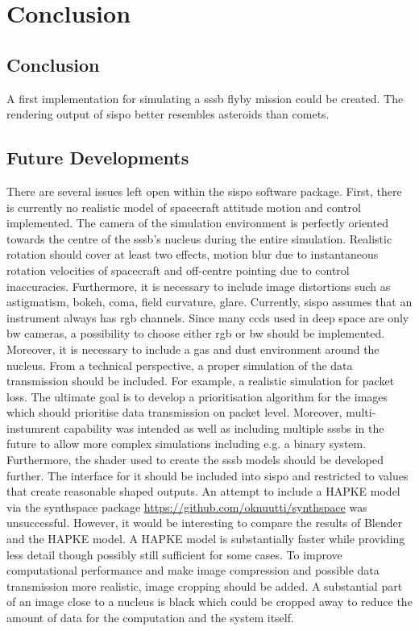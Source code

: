 \section{Conclusion} \label{sec:conclusion}
\subsection{Conclusion}
A first implementation for simulating a \gls{sssb} flyby mission could be created.
The rendering output of \gls{sispo} better resembles asteroids than comets.

\subsection{Future Developments}
There are several issues left open within the \gls{sispo} software package. First, there is currently no realistic model of spacecraft attitude motion and control implemented. The camera of the simulation environment is perfectly oriented towards the centre of the \gls{sssb}'s nucleus during the entire simulation. Realistic rotation should cover at least two effects, motion blur due to instantaneous rotation velocities of spacecraft and off-centre pointing due to control inaccuracies. Furthermore, it is necessary to include  image distortions such as astigmatism, bokeh, coma, field curvature, glare.
Currently, \gls{sispo} assumes that an instrument always has \gls{rgb} channels. Since many \gls{ccd}s used in deep space are only \gls{bw} cameras, a possibility to choose either \gls{rgb} or \gls{bw} should be implemented.
Moreover, it is necessary to include a gas and dust environment around the nucleus. From a technical perspective, a proper simulation of the data transmission should be included. For example, a realistic simulation for packet loss. The ultimate goal is to develop a prioritisation algorithm for the images which should prioritise data transmission on packet level.
Moreover, multi-instumrent capability was intended as well as including multiple \gls{sssb}s in the future to allow more complex simulations including e.g. a binary system.
Furthermore, the shader used to create the \gls{sssb} models should be developed further. The interface for it should be included into \gls{sispo} and restricted to values that create reasonable shaped outputs.
An attempt to include a HAPKE model via the synthspace package \url{https://github.com/oknuutti/synthspace} was unsuccessful. However, it would be interesting to compare the results of Blender and the HAPKE model. A HAPKE model is substantially faster while providing less detail though possibly still sufficient for some cases.
To improve computational performance and make image compression and possible data transmission more realistic, image cropping should be added. A substantial part of an image close to a nucleus is black which could be cropped away to reduce the amount of data for the computation and the system itself.